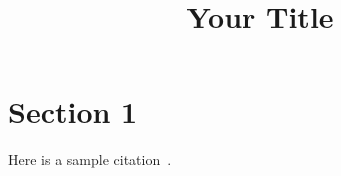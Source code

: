 \documentclass[12pt, english]{nserc-appendix}
\begin{document}
\title{Your Title}

\setcounter{page}{1}
\maketitle

\section{Section 1}
\vspace{-10pt}
Here is a sample citation~\cite{cheshmi2017sympiler}. 
\lipsum[2-10]





\newpage
\pagestyle{plain}


\end{document}

